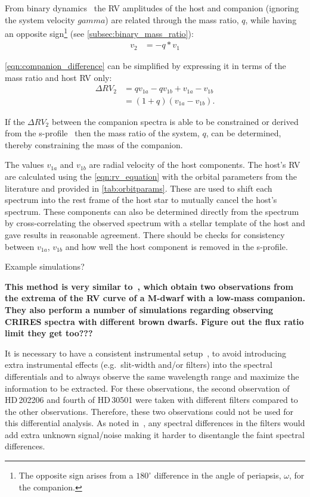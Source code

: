 From binary dynamics~\citep[e.g.][]{murray_keplerian_2010} the {RV} amplitudes of the host and companion (ignoring the system velocity $gamma$) are related through the mass ratio, \(q\), while having an opposite sign\footnote{The opposite sign arises from a \(180^\circ\) difference in the angle of periapsis, \(\omega\), for the companion.} (see \cref{subsec:binary_mass_ratio}):
\begin{align}
v_{2} &= -q * v_{1} \label{eqn:q_relation}
\end{align}

\cref{eqn:companion_difference} can be simplified by expressing it in terms of the mass ratio and host {RV} only:
\begin{align}
\Delta {RV}_{2} &= q v_{1a} - q v_{1b} + v_{1a} - v_{1b} \nonumber \\
&= (1 + q)(v_{1a} - v_{1b}).\label{eqn:companion_difference_simplified}
\end{align}

If the \(\Delta {RV}_2\) between the companion spectra is able to be constrained or derived from the s-profile~\citep[see][]{ferluga_separating_1997} then the mass ratio of the system, \(q\), can be determined, thereby constraining the mass of the companion.

The values \(v_{1a}\) and \(v_{1b}\) are radial velocity of the host components.
The host's {RV} are calculated using the \cref{eqn:rv_equation} with the orbital parameters from the literature and provided in \cref{tab:orbitparams}.
These are used to shift each spectrum into the rest frame of the host star to mutually cancel the host's spectrum.
These components can also be determined directly from the spectrum by cross-correlating the observed spectrum with a stellar template of the host and gave results in reasonable agreement.
There should be checks for consistency between \(v_{1a}\), \(v_{1b}\) and how well the host component is removed in the s-profile.

Example simulations?

\textbf{This method is very similar to~\citet{kostogryz_spectral_2013}, which obtain two observations from the extrema of the {RV} curve of a M-dwarf with a low-mass companion.
They also perform a number of simulations regarding observing {CRIRES} spectra with different brown dwarfs.
Figure out the flux ratio limit they get too???}

It is necessary to have a consistent instrumental setup~\citep{ferluga_separating_1997}, to avoid introducing extra instrumental effects (e.g.\ slit-width and/or filters) into the spectral differentials and to always observe the same wavelength range and maximize the information to be extracted.
For these observations, the second observation of {HD\,202206} and fourth of {HD\,30501} were taken with different filters compared to the other observations.
Therefore, these two observations could not be used for this differential analysis.
As noted in~\citet{hadrava_disentangling_2009}, any spectral differences in the filters would add extra unknown signal/noise making it harder to disentangle the faint spectral differences.


